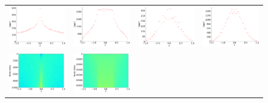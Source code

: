 \documentclass[senior,final,11pt]{iscs-thesis}
\begin{document}
\begin{figure}[htbp]
  \setlength\tabcolsep{0pt}
  \hspace{-3.0cm}
  \begin{tabular}{cccc}
    \includegraphics[width=45mm]{figure/grid_graph_dim[100,100]txt_dos.png} &
    \includegraphics[width=45mm]{figure/grid_graph_dim[40,40,40]txt_dos.png} &
    \includegraphics[width=45mm]{figure/grid_graph_dim[9,9,9,9]txt_dos.png} &
    \includegraphics[width=45mm]{figure/grid_graph_dim[8,8,8,8,8]txt_dos.png} \\
    \includegraphics[width=45mm]{figure/grid_graph_dim[100,100]txt_pdos.png} &
    \includegraphics[width=45mm]{figure/grid_graph_dim[40,40,40]txt_pdos.png} &

\end{tabular}
\end{figure}
\end{document}
